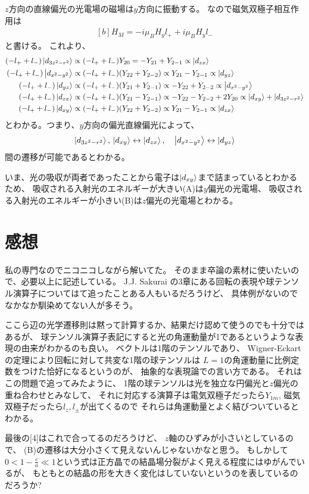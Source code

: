 \documentclass[../ap_2011.tex]{subfiles}
\begin{document}
\(z\)方向の直線偏光の光電場の磁場は\(y\)方向に振動する。
なので磁気双極子相互作用は
\begin{equation}\begin{aligned}[b]
    H_M = -i\mu_BH_yl_+ + i\mu_BH_yl_-
\end{aligned}\end{equation}
と書ける。
これより、
\begin{equation}\begin{aligned}[b]
    (-l_+ +l_-)\ket{d_{3z^2-r^2}} &\propto (-l_+ +l_-) Y_{20} = -Y_{21}+Y_{2-1} \propto \ket{d_{zx}}\\
    (-l_+ +l_-)\ket{d_{x^2-y^2}} &\propto (-l_+ +l_-) (Y_{22}+Y_{2-2}) \propto Y_{21}-Y_{2-1} \propto \ket{d_{yz}}\\
    (-l_+ +l_-)\ket{d_{yz}} &\propto (-l_+ +l_-) (Y_{21}+Y_{2-1}) \propto -Y_{22}+Y_{2-2} \propto \ket{d_{x^2-y^2}}\\
    (-l_+ +l_-)\ket{d_{zx}} &\propto (-l_+ +l_-) (Y_{21}-Y_{2-1}) \propto -Y_{22}-Y_{2-2}+2Y_{20} \propto \ket{d_{xy}}+\ket{d_{3z^2-r^2}}\\
    (-l_+ +l_-)\ket{d_{xy}} &\propto (-l_+ +l_-) (Y_{22}+Y_{2-2}) \propto Y_{21}-Y_{2-1} \propto \ket{d_{zx}}
\end{aligned}\end{equation}
とわかる。つまり、\(y\)方向の偏光直線偏光によって、
\begin{equation}\begin{aligned}[b]
    \ket{d_{3z^2-r^2}},\,\ket{d_{xy}}\leftrightarrow \ket{d_{zx}},\quad \ket{d_{x^2-y^2}}\leftrightarrow\ket{d_{yz}}
\end{aligned}\end{equation}
間の遷移が可能であるとわかる。

いま、光の吸収が両者であったことから電子は\(\ket{d_{xy}}\)まで詰まっているとわかるため、
吸収される入射光のエネルギーが大きい(A)は\(y\)偏光の光電場、
吸収される入射光のエネルギーが小きい(B)は\(z\)偏光の光電場とわかる。

\section*{感想}
私の専門なのでニコニコしながら解いてた。
そのまま卒論の素材に使いたいので、必要以上に記述している。
J.J. Sakurai の3章にある回転の表現や球テンソル演算子についてはて追ったことある人もいるだろうけど、
具体例がないのでなかなか馴染めてない人が多そう。

ここら辺の光学遷移則は黙って計算するか、結果だけ認めて使うのでも十分ではあるが、
球テンソル演算子表記にすると光の角運動量が1であるというような表現の由来がわかるのも良い。
ベクトルは1階のテンソルであり、
Wigner-Eckart の定理により回転に対して共変な1階の球テンソルは
\(L=1\)の角運動量に比例定数をつけた恰好になるというのが、
抽象的な表現論での言い方である。
それはこの問題で追ってみたように、
1階の球テンソルは光を独立な円偏光と\(z\)偏光の重ね合わせとみなして、
それに対応する演算子は電気双極子だったら\(Y_{1m}\), 磁気双極子だったら\(l_z,l_\pm\)が出てくるので
それらは角運動量とよく結びついているとわかる。

最後の[4]はこれで合ってるのだろうけど、
\(z\)軸のひずみが小さいとしているので、
(B)の遷移は大分小さくて見えないんじゃないかなと思う。
もしかして\(0<1-\frac{c}{a}\ll 1\)という式は正方晶での結晶場分裂がよく見える程度にはゆがんでいるが、
もともとの結晶の形を大きく変化はしていないというのを表しているのだろうか?
\end{document}
